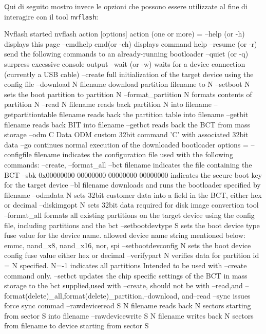 Qui di seguito mostro invece le opzioni che possono essere utilizzate al fine
di interagire con il tool \texttt{nvflash}:
\begin{bash}
Nvflash started
nvflash action [options]
action (one or more) =
   --help (or -h)
       displays this page
   --cmdhelp cmd(or -ch)
       displays command help 
   --resume (or -r)
       send the following commands to an already-running bootloader
   --quiet (or -q)
       surpress excessive console output
   --wait (or -w)
       waits for a device connection (currently a USB cable)
   --create
       full initialization of the target device using the config file
   --download N filename
       download partition filename to N
   --setboot N
       sets the boot partition to partition N
   --format_partition N
       formats contents of partition N
   --read N filename
       reads back partition N into filename
   --getpartitiontable filename
       reads back the partition table into filename
   --getbit filename
       reads back BIT into filename
   --getbct
       reads back the BCT from mass storage
   --odm C Data
        ODM custom 32bit command 'C' with associated 32bit data
   --go
       continues normal execution of the downloaded bootloader
    options =
   --configfile filename
       indicates the configuration file used with the following commands:
       --create, --format_all
   --bct filename
       indicates the file containing the BCT
   --sbk 0x00000000 00000000 00000000 00000000
       indicates the secure boot key for the target device
   --bl filename
       downloads and runs the bootloader specified by filename
   --odmdata N
      sets 32bit customer data into a field in the BCT, either hex or
      decimal
   --diskimgopt N
       sets 32bit data required for disk image convertion tool
   --format_all
       formats all existing partitions on the target device using the config file,
       including partitions and the bct
   --setbootdevtype S
       sets the boot device type fuse value for the device name.
       allowed device name string mentioned below:
           emmc, nand_x8, nand_x16, nor, spi
   --setbootdevconfig N
       sets the boot device config fuse value either hex or decimal
   --verifypart N
        verifies data for partition id = N specified. N=-1 
        indicates all partitions
        Intended to be used with --create command only.
   --setbct
       updates the chip specific settings of the BCT in mass storage to
       the bct supplied,used with --create, should not be with --read,and
       --format(delete)_all,format(delete)_partition,--download, and--read
   --sync
       issues force sync commad
   --rawdeviceread S N filename
       reads back N sectors starting from sector S into filename
   --rawdevicewrite S N filename
       writes back N sectors from filename to device starting from sector S 
\end{bash}




